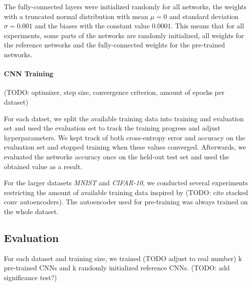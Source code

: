 \documentclass[draft]{article}
\begin{document}
    The fully-connected layers were initialized randomly for all networks, the weights with a truncated normal distribution with mean $\mu = 0$ and standard deviation $\sigma = 0.001$ and the biases with the constant value $0.0001$.
    This means that for all experiments, some parts of the networks are randomly initialized, all weights for the reference networks and the fully-connected weights for the pre-trained networks. 

    \paragraph{CNN Training}
    (TODO: optimizer, step size, convergence criterion, amount of epochs per dataset)

    For each datset, we split the available training data into training and evaluation set and used the evaluation set to track the training progress and adjust hyperparameters. We kept track of both cross-entropy error and accuracy on the evaluation set and stopped training when these values converged. Afterwards, we evaluated the networks accuracy once on the held-out test set and used the obtained value as a result. 

    For the larger datasets \emph{MNIST} and \emph{CIFAR-10}, we conducted several experiments restricting the amount of available training data inspired by (TODO: cite stacked conv autoencoders). The autoencoder used for pre-training was always trained on the whole dataset. 


  \subsection{Evaluation}
    For each dataset and training size, we trained (TODO adjust to real number) k pre-trained CNNs and k randomly initialized reference CNNs. (TODO: add significance test?)
  
\end{document}
